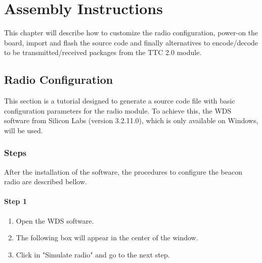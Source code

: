 %
%
%
%
%

%
%
%
%
%
%

\chapter{Assembly Instructions} \label{ch:assembly}

This chapter will describe how to customize the radio configuration, power-on the board, import and flash the source code and finally alternatives to encode/decode to be transmitted/received packages from the TTC 2.0 module.

\section{Radio Configuration}\label{sec:wds}

This section is a tutorial designed to generate a source code file with basic configuration parameters for the radio module. To achieve this, the WDS software from Silicon Labs (version 3.2.11.0), which is only available on Windows, will be used.

\subsection{Steps}

After the installation of the software, the procedures to configure the beacon radio are described bellow.

\subsubsection{Step 1}

\begin{enumerate}
    \item Open the WDS software.
    \item The following box will appear in the center of the window.
    \item Click in "Simulate radio" and go to the next step.
\end{enumerate}


